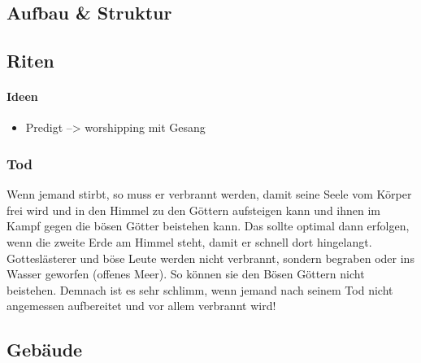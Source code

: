 \subsection{Aufbau \& Struktur}

\subsection{Riten}
\paragraph{Ideen}
\begin{itemize}
	\item Predigt --> worshipping mit Gesang
\end{itemize}

\subsubsection{Tod}
Wenn jemand stirbt, so muss er verbrannt werden, damit seine Seele vom Körper frei wird und in den Himmel zu den Göttern aufsteigen kann und ihnen im Kampf gegen die bösen Götter beistehen kann. Das sollte optimal dann erfolgen, wenn die zweite Erde am Himmel steht, damit er schnell dort hingelangt. 
Gotteslästerer und böse Leute werden nicht verbrannt, sondern begraben oder ins Wasser geworfen (offenes Meer). So können sie den Bösen Göttern nicht beistehen.
Demnach ist es sehr schlimm, wenn jemand nach seinem Tod nicht angemessen aufbereitet und vor allem verbrannt wird!

\subsection{Gebäude}
